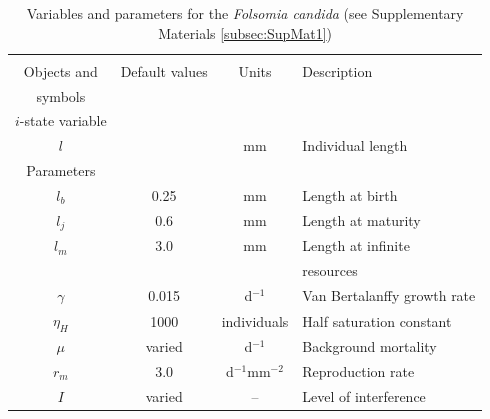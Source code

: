 \begin{table}
\caption{\label{tab:param}Variables and parameters for the \textit{Folsomia
candida} (see Supplementary Materials \ref{subsec:SupMat1})}
\begin{tabular}{cccl}
\hline
\hline 
 & & &\\
 Objects and  & Default values & Units & Description\\ 
symbols & & &\\
\hline
	$i$-state variable & & & \\ 
	$l$ &   & mm & Individual length \\ 
	Parameters & & & \\ 
	$l_{b}$ & 0.25 & mm & Length at birth \\ 
	$l_{j}$ & 0.6 & mm & Length at maturity \\ 
	$l_{m}$ & 3.0 & mm & Length at infinite\\
	& & &  resources \\ 
	$\gamma$ & 0.015 & d$^{-1}$ & Van Bertalanffy growth rate \\ 
	$\eta_{H}$ & 1000 & individuals & Half saturation constant \\ 
	$\mu$ & varied & d$^{-1}$ & Background mortality \\ 
	$r_{m}$ & 3.0 & d$^{-1}$mm$^{-2}$ & Reproduction rate \\ 
	  $I$ & varied & -- & Level of interference\\
\hline 
\end{tabular} 
\end{table}



